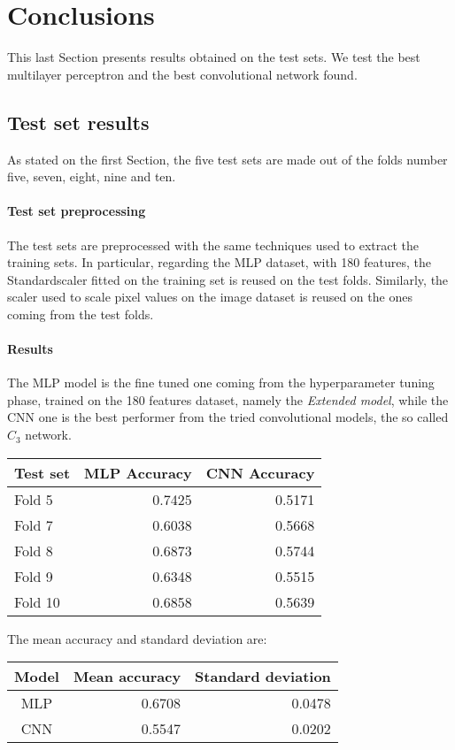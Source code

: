 \section{Conclusions}
\label{results}

This last Section presents results obtained on the test sets. 
We test the best multilayer perceptron and the best convolutional network found.

\subsection{Test set results}
As stated on the first Section, the five test sets are made out of the 
folds number five, seven, eight, nine and ten.

\paragraph{Test set preprocessing}
The test sets are preprocessed with the same techniques used to extract the training sets.
In particular, regarding the MLP dataset, with 180 features, the Standardscaler fitted on the 
training set is reused on the test folds. 
Similarly, the scaler used to scale pixel values on the image dataset is reused on the ones coming 
from the test folds.

\paragraph{Results}
The MLP model is the fine tuned one coming from the hyperparameter tuning phase, 
trained on the 180 features dataset, namely the \emph{Extended model}, 
while the CNN one is the best performer from the tried convolutional models, 
the so called $C_3$ network.
\begin{center}
    \begin{tabular}{ |l|r|r| } 
        \hline
        Test set & MLP Accuracy & CNN Accuracy\\
        \hline
        Fold 5 & 0.7425 & 0.5171\\
        Fold 7 & 0.6038 & 0.5668\\
        Fold 8 & 0.6873 & 0.5744\\
        Fold 9 & 0.6348 & 0.5515\\
        Fold 10 & 0.6858 & 0.5639\\ 
        \hline
    \end{tabular}
\end{center}

The mean accuracy and standard deviation are: 
\begin{center}
    \begin{tabular}{ |c|r|r| } 
        \hline
        Model & Mean accuracy & Standard deviation\\
        \hline
        MLP & 0.6708 & 0.0478 \\
        CNN & 0.5547 & 0.0202 \\
        \hline
    \end{tabular}
\end{center}


